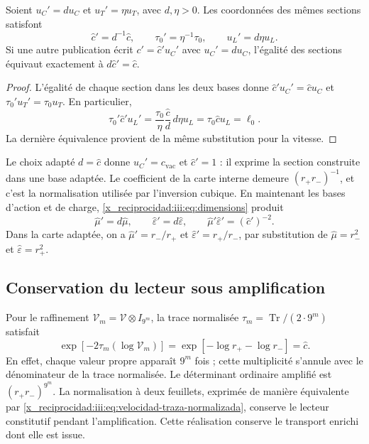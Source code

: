 \begin{proposition}
Soient $u_C'=d u_C$ et $u_T'=\eta u_T$, avec $d,\eta>0$. Les coordonnées des mêmes sections satisfont
\begin{equation}
 \widehat c'=d^{-1}\widehat c,
 \qquad \tau_0'=\eta^{-1}\tau_0,
 \qquad u_L'=d\eta u_L.
 \label{x_reciprocidad:iii:eq:velocidad-cambio-carta}
\end{equation}
Si une autre publication écrit $c'=\widehat c' u_C'$ avec $u_C'=d u_C$,
l’égalité des sections équivaut exactement à $d\widehat c'=\widehat c$.
\end{proposition}
\begin{proof}
L'égalité de chaque section dans les deux bases donne $\widehat c'u_C'=\widehat c u_C$ et $\tau_0'u_T'=\tau_0u_T$. En particulier,
\[
 \tau_0'\widehat c'u_L'
 =\frac{\tau_0}{\eta}\frac{\widehat c}{d}\,d\eta u_L
 =\tau_0\widehat c u_L=\ell_0.
\]
La dernière équivalence provient de la même substitution pour la vitesse.
\end{proof}

Le choix adapté $d=\widehat c$ donne $u_C'=c_{\mathrm{vac}}$ et
$\widehat c'=1$ : il exprime la section construite dans une base adaptée.
Le coefficient de la carte interne demeure $(r_+r_-)^{-1}$, et c’est
la normalisation utilisée par l’inversion cubique. En maintenant les
bases d’action et de charge, \eqref{x_reciprocidad:iii:eq:dimensions} produit
\[
 \widehat\mu'=d\widehat\mu,\qquad
 \widehat\varepsilon'=d\widehat\varepsilon,\qquad
 \widehat\mu'\widehat\varepsilon'=(\widehat c')^{-2}.
\]
Dans la carte adaptée, on a $\widehat\mu'=r_-/r_+$ et
$\widehat\varepsilon'=r_+/r_-$, par substitution de
$\widehat\mu=r_-^2$ et $\widehat\varepsilon=r_+^2$.

\subsection{Conservation du lecteur sous amplification}

Pour le raffinement $\mathcal V_m=\mathcal V\otimes I_{9^m}$, la trace normalisée $\tau_m=\operatorname{Tr}/(2\cdot9^m)$ satisfait
\begin{equation}
 \exp[-2\tau_m(\log\mathcal V_m)]
 =\exp[-\log r_+-\log r_-]=\widehat c.
 \label{x_reciprocidad:iii:eq:velocidad-traza-normalizada}
\end{equation}
En effet, chaque valeur propre apparaît $9^m$ fois ; cette multiplicité
s’annule avec le dénominateur de la trace normalisée. Le déterminant
ordinaire amplifié est $(r_+r_-)^{9^m}$. La normalisation à deux feuillets,
exprimée de manière équivalente par \eqref{x_reciprocidad:iii:eq:velocidad-traza-normalizada},
conserve le lecteur constitutif pendant l’amplification. Cette
réalisation conserve le transport enrichi dont elle est issue.

